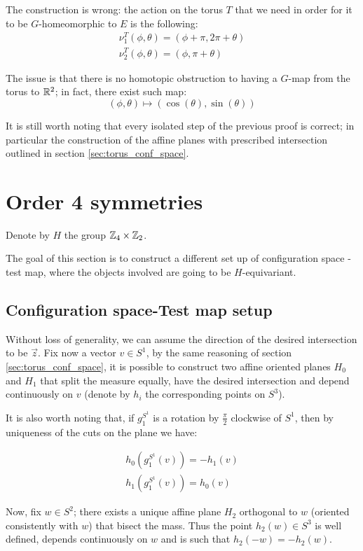 \documentclass[10pt]{article}
\begin{document}
The construction is wrong: the action on the torus $T$ that we need in order for it to be $G$-homeomorphic to $E$ is the following:
\begin{align*}
	\nu^T_1(\phi, \theta) = (\phi + \pi, 2\pi + \theta) \\
	\nu^T_2(\phi, \theta) = (\phi, \pi + \theta)
\end{align*}

The issue is that there is no homotopic obstruction to having a $G$-map from the torus to $\mathbb{R}^2$; in fact, there exist such map:
\[
	(\phi, \theta) \mapsto (\cos(\theta), \sin(\theta))
\]

It is still worth noting that every isolated step of the previous proof is correct; in particular the construction of the affine planes with prescribed intersection outlined in section \ref{sec:torus_conf_space}.


\section{Order 4 symmetries}
Denote by $H$ the group $\mathbb{Z}_4\times \mathbb{Z}_2$. 

The goal of this section is to construct a different set up of configuration space - test map, where the
objects involved are going to be $H$-equivariant.

\subsection{Configuration space-Test map setup}

Without loss of generality, we can assume the direction of the desired intersection to be $\vec{z}$. Fix now
a vector $v\in S^1$, by the same reasoning of section \ref{sec:torus_conf_space}, it is possible to construct 
two  affine oriented planes $H_0$ and $H_1$ that split the measure equally, have the desired intersection and 
depend continuously on $v$ (denote by $h_i$ the corresponding points on $S^3$).

It is also worth noting that, if $g_1^{S^1}$ is a rotation by $\frac{\pi}{2}$ clockwise of $S^1$, then by uniqueness of the cuts on the plane we have:

\begin{align*}
	h_0(g_1^{S^1}(v)) = -h_1(v)\\
	h_1(g_1^{S^1}(v)) = h_0(v)
\end{align*}

Now, fix $w\in S^2$; there exists a unique affine plane $H_2$ orthogonal to $w$ (oriented consistently with $w$) 
that bisect the mass. Thus the point $h_2(w)\in S^3$ is well defined, depends continuously on $w$ and is such that
$h_2(-w) = - h_2(w)$.
\end{document}
